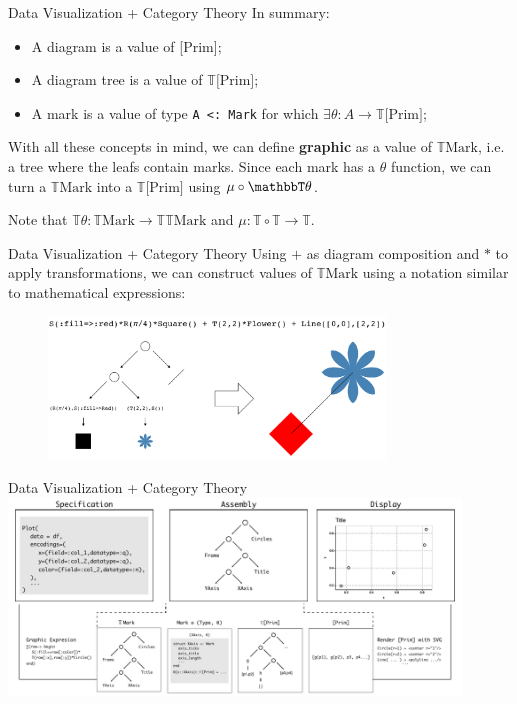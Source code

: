 \documentclass[aspectratio=169,xcolor=dvipsnames,10pt]{beamer}
\theoremstyle{definition}
\begin{document}
\begin{frame}[fragile]{Data Visualization + Category Theory}
  In summary:
  \begin{itemize}
      \item A diagram is a value of [Prim];
      \item A diagram tree is a value of $\mathbb T \text{[Prim]}$;
      \item A mark is a value of type \texttt{A <: Mark} for which $\exists \theta:A \to \mathbb T\text{[Prim]}$;
  \end{itemize}

  \vspace{3mm}
   
   With all these concepts in mind, we can define \textbf{graphic} as a value of $\mathbb T \text{Mark}$,
  i.e. a tree where the leafs contain marks. Since each mark has a $\theta$ function,
  we can turn a $\mathbb T\text{Mark}$ into a $\mathbb T \text{[Prim]}$ using $\mu \circ \mathbbT \theta$.

  \vspace{3mm}

  Note that $\mathbb T \theta: \mathbb T\text{Mark} \to \mathbb T \mathbb T \text{Mark}$ and
  $\mu:\mathbb T \circ \mathbb T \to \mathbb T$.
\end{frame}


\begin{frame}[fragile]{Data Visualization + Category Theory}
  Using $+$ as diagram composition and $*$ to apply transformations,
  we can construct values of $\mathbb T\text{Mark}$ using a notation similar to
  mathematical expressions:
  \begin{figure}
    \begin{center}
        \includegraphics[width=0.8\textwidth]{./figs/graphic.pdf}
    \end{center}
  \end{figure}
\end{frame}

\begin{frame}[fragile]{Data Visualization + Category Theory}
    \centering
    \includegraphics[width=0.9\textwidth]{figs/pipe.pdf}
\end{frame}
\end{document}
